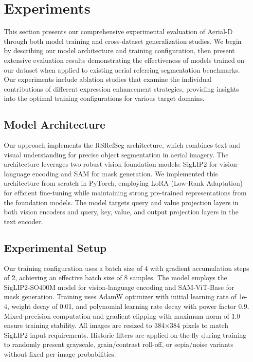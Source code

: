 
\section{Experiments}
\label{sec:experiments}

This section presents our comprehensive experimental evaluation of Aerial-D through both model training and cross-dataset generalization studies. We begin by describing our model architecture and training configuration, then present extensive evaluation results demonstrating the effectiveness of models trained on our dataset when applied to existing aerial referring segmentation benchmarks. Our experiments include ablation studies that examine the individual contributions of different expression enhancement strategies, providing insights into the optimal training configurations for various target domains.

\subsection{Model Architecture}
\label{subsec:model_architecture}

Our approach implements the RSRefSeg architecture, which combines text and visual understanding for precise object segmentation in aerial imagery. The architecture leverages two robust vision foundation models: SigLIP2 for vision-language encoding and SAM for mask generation. We implemented this architecture from scratch in PyTorch, employing LoRA (Low-Rank Adaptation) for efficient fine-tuning while maintaining strong pre-trained representations from the foundation models. The model targets query and value projection layers in both vision encoders and query, key, value, and output projection layers in the text encoder.

\subsection{Experimental Setup}
\label{subsec:experimental_setup}

Our training configuration uses a batch size of 4 with gradient accumulation steps of 2, achieving an effective batch size of 8 samples. The model employs the SigLIP2-SO400M model for vision-language encoding and SAM-ViT-Base for mask generation. Training uses AdamW optimizer with initial learning rate of 1e-4, weight decay of 0.01, and polynomial learning rate decay with power factor 0.9. Mixed-precision computation and gradient clipping with maximum norm of 1.0 ensure training stability. All images are resized to 384×384 pixels to match SigLIP2 input requirements. Historic filters are applied on-the-fly during training to randomly present grayscale, grain/contrast roll-off, or sepia/noise variants without fixed per-image probabilities.

